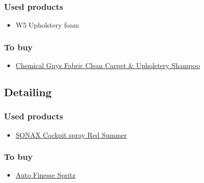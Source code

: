 \documentclass[12pt, a4paper, portrait]{article}
\begin{document}
\subsubsection{Used products}
\begin{itemize}
\item{W5 Upholstery foam}
\end{itemize}
\subsubsection{To buy}
\begin{itemize}
\item{\href{https://www.chemicalguys.com/Fabric_Clean_Carpet_Upholstery_Shampoo_16_oz_p/cws20316.htm}{Chemical Guys Fabric Clean Carpet \& Upholstery Shampoo}}
\end{itemize}

\subsection{Detailing}
\subsubsection{Used products}
\begin{itemize}
\item{\href{https://www.sonax.com/Product-Search/(location)/21031-SONAX-Cockpit-spray-Red-Summer}{SONAX Cockpit spray Red Summer}}
\end{itemize}
\subsubsection{To buy}
\begin{itemize}
\item{\href{https://shop.autofinesse.co.uk/spritz-500ml}{Auto Finesse Spritz}}
\end{itemize}
\end{document}
